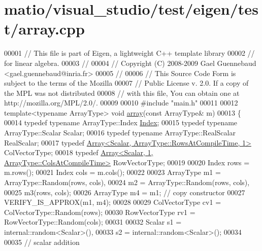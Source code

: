 \hypertarget{matio_2visual__studio_2test_2eigen_2test_2array_8cpp_source}{}\section{matio/visual\+\_\+studio/test/eigen/test/array.cpp}
\label{matio_2visual__studio_2test_2eigen_2test_2array_8cpp_source}

\begin{DoxyCode}
00001 \textcolor{comment}{// This file is part of Eigen, a lightweight C++ template library}
00002 \textcolor{comment}{// for linear algebra.}
00003 \textcolor{comment}{//}
00004 \textcolor{comment}{// Copyright (C) 2008-2009 Gael Guennebaud <gael.guennebaud@inria.fr>}
00005 \textcolor{comment}{//}
00006 \textcolor{comment}{// This Source Code Form is subject to the terms of the Mozilla}
00007 \textcolor{comment}{// Public License v. 2.0. If a copy of the MPL was not distributed}
00008 \textcolor{comment}{// with this file, You can obtain one at http://mozilla.org/MPL/2.0/.}
00009 
00010 \textcolor{preprocessor}{#include "main.h"}
00011 
00012 \textcolor{keyword}{template}<\textcolor{keyword}{typename} ArrayType> \textcolor{keywordtype}{void} \hyperlink{class_eigen_1_1array}{array}(\textcolor{keyword}{const} ArrayType& m)
00013 \{
00014   \textcolor{keyword}{typedef} \textcolor{keyword}{typename} ArrayType::Index \hyperlink{namespace_eigen_a62e77e0933482dafde8fe197d9a2cfde}{Index};
00015   \textcolor{keyword}{typedef} \textcolor{keyword}{typename} ArrayType::Scalar Scalar;
00016   \textcolor{keyword}{typedef} \textcolor{keyword}{typename} ArrayType::RealScalar RealScalar;
00017   \textcolor{keyword}{typedef} \hyperlink{group___core___module_class_eigen_1_1_array}{Array<Scalar, ArrayType::RowsAtCompileTime, 1>} 
      ColVectorType;
00018   \textcolor{keyword}{typedef} \hyperlink{group___core___module_class_eigen_1_1_array}{Array<Scalar, 1, ArrayType::ColsAtCompileTime>} 
      RowVectorType;
00019 
00020   Index rows = m.rows();
00021   Index cols = m.cols(); 
00022 
00023   ArrayType m1 = ArrayType::Random(rows, cols),
00024              m2 = ArrayType::Random(rows, cols),
00025              m3(rows, cols);
00026   ArrayType m4 = m1; \textcolor{comment}{// copy constructor}
00027   VERIFY\_IS\_APPROX(m1, m4);
00028 
00029   ColVectorType cv1 = ColVectorType::Random(rows);
00030   RowVectorType rv1 = RowVectorType::Random(cols);
00031 
00032   Scalar  s1 = internal::random<Scalar>(),
00033           s2 = internal::random<Scalar>();
00034 
00035   \textcolor{comment}{// scalar addition}

\end{DoxyCode}

